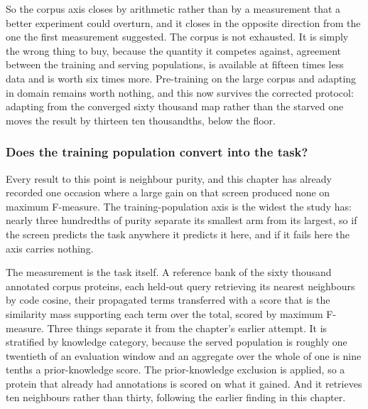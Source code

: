So the corpus axis closes by arithmetic rather than by a measurement that a better
experiment could overturn, and it closes in the opposite direction from the one the
first measurement suggested. The corpus is not exhausted. It is simply the wrong thing
to buy, because the quantity it competes against, agreement between the training and
serving populations, is available at fifteen times less data and is worth six times more.
Pre-training on the large corpus and adapting in domain remains worth nothing, and this
now survives the corrected protocol: adapting from the converged sixty thousand map
rather than the starved one moves the result by thirteen ten thousandths, below the
floor.

\subsubsection{Does the training population convert into the task?}

Every result to this point is neighbour purity, and this chapter has already recorded one
occasion where a large gain on that screen produced none on maximum F-measure. The
training-population axis is the widest the study has: nearly three hundredths of purity
separate its smallest arm from its largest, so if the screen predicts the task anywhere
it predicts it here, and if it fails here the axis carries nothing.

The measurement is the task itself. A reference bank of the sixty thousand annotated
corpus proteins, each held-out query retrieving its nearest neighbours by code cosine,
their propagated terms transferred with a score that is the similarity mass supporting
each term over the total, scored by maximum F-measure. Three things separate it from the
chapter's earlier attempt. It is stratified by knowledge category, because the served
population is roughly one twentieth of an evaluation window and an aggregate over the
whole of one is nine tenths a prior-knowledge score. The prior-knowledge exclusion is
applied, so a protein that already had annotations is scored on what it gained. And it
retrieves ten neighbours rather than thirty, following the earlier finding in this
chapter.

\begin{table}[htbp]
  \centering
  \caption{Maximum F-measure against the deployed encoder in the served, no-knowledge
  cell, at ten neighbours. Intervals are a paired bootstrap over proteins with the
  measure recomputed inside every resample.}
  \label{tab:exp15-fmax-serving}
  
\end{table}

